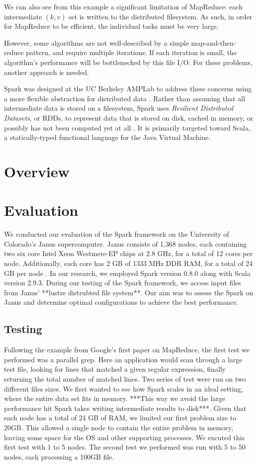 \documentclass{article}
\begin{document}
We can also see from this example a significant limitation of MapReduce: each
intermediate $(k, v)$ set is written to the distributed filesystem.  As such,
in order for MapReduce to be efficient, the individual tasks must be very
large.

However, some algorithms are not well-described by a simple map-and-then-reduce
pattern, and require multiple iterations.  If each iteration is small, the
algorithm's performance will be bottlenecked by this file I/O. For these
problems, another approach is needed.

Spark was designed at the UC Berkeley AMPLab to address these concerns using a
more flexible abstraction for distributed data \citep{zaharia}. Rather than
assuming that all intermediate data is stored on a filesystem, Spark uses
\emph{Resilient Distributed Datasets}, or RDDs, to represent data that is
stored on disk, cached in memory, or possibly has not been computed yet at all
\citep{zaharia_rdd}.  It is primarily targeted toward Scala, a statically-typed
functional language for the Java Virtual Machine.

\section{Overview}

\section{Evaluation}
We conducted our evaluation of the Spark framework on the University of
Colorado's Janus supercomputer.  Janus consists of 1,368 nodes, each containing
two six core Intel Xeon Westmere-EP chips at 2.8 GHz, for a total of 12 cores
per node.  Additionally, each core has 2 GB of 1333 MHz DDR RAM, for a total of
24 GB per node \cite{JanusPaper}. In our research, we employed Spark version
0.8.0 along with Scala version 2.9.3. During our testing of the Spark framework,
we access input files from Janus' **lustre distrubted file system**. %
Our aim was to assess the Spark on Janus and determine optimal configurations
to achieve the best performance.

\subsection{Testing}
Following the example from Google's first paper on MapReduce, the first test we
performed was a parallel grep. Here an application would scan through a large
test file, looking for lines that matched a given regular expression, finally
returning the total number of matched lines. Two series of test were run on two
different files sizes. We first wanted to see how Spark scales in an ideal
setting, where the entire data set fits in memory. ***This way we avoid the
large performance hit Spark takes writing intermediate results to disk***.
Given that each node has a total of 24 GB of RAM, we limited our first problem
size to 20GB. This allowed a single node to contain the entire problem in
memory, leaving some space for the OS and other supporting processes. We
excuted this first test with 1 to 5 nodes. The second test we performed was
run with 5 to 50 nodes, each processing a 100GB file.
\end{document}
